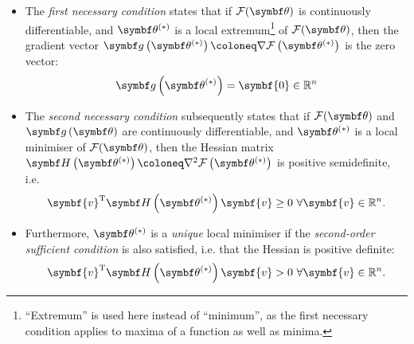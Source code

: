 \begin{itemize}
    \item The \emph{first necessary condition} states
        that if $\Fth$ is continuously differentiable, and $\bthstar$ is a local extremum\footnote{
            ``Extremum'' is used here instead of ``minimum'', as the first necessary
            condition applies to maxima of a function as well as minima.
        } of $\Fth$, then the gradient vector $\bdgthstar \coloneq \nabla \Fthstar$ is the
        zero vector:
        \begin{equation}
            \bdgthstar = \symbf{0} \in \mathbb{R}^n
        \end{equation}
    \item The \emph{second necessary condition} subsequently states that
        if $\Fth$ and $\bdgth$ are continuously differentiable, and $\bthstar$ is a
        local minimiser of $\Fth$, then the Hessian matrix $\bdHthstar \coloneq
        \nabla^2 \Fthstar$ is positive semidefinite, i.e.
        \begin{equation}
          \symbf{v}^{\mathrm{T}} \bdHthstar \symbf{v} \geq 0\ \forall \symbf{v} \in \mathbb{R}^n.
        \end{equation}
        \item Furthermore, $\bthstar$ is a \emph{unique} local minimiser if the \emph{second-order
            sufficient condition} is also satisfied, i.e. that the Hessian is positive
            definite:
            \begin{equation}
                \symbf{v}^{\mathrm{T}} \bdHthstar \symbf{v} > 0\ \forall \symbf{v} \in \mathbb{R}^n.
            \end{equation}
\end{itemize}

